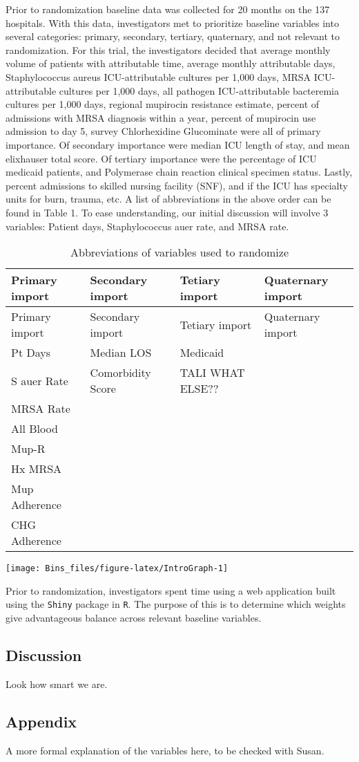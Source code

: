 \documentclass[]{sagej}
\begin{document}
Prior to randomization baseline data was collected for 20 months on the
137 hospitals. With this data, investigators met to prioritize baseline
variables into several categories: primary, secondary, tertiary,
quaternary, and not relevant to randomization. For this trial, the
investigators decided that average monthly volume of patients with
attributable time, average monthly attributable days, Staphylococcus
aureus ICU-attributable cultures per 1,000 days, MRSA ICU-attributable
cultures per 1,000 days, all pathogen ICU-attributable bacteremia
cultures per 1,000 days, regional mupirocin resistance estimate, percent
of admissions with MRSA diagnosis within a year, percent of mupirocin
use admission to day 5, survey Chlorhexidine Glucominate were all of
primary importance. Of secondary importance were median ICU length of
stay, and mean elixhauser total score. Of tertiary importance were the
percentage of ICU medicaid patients, and Polymerase chain reaction
clinical specimen status. Lastly, percent admissions to skilled nursing
facility (SNF), and if the ICU has specialty units for burn, trauma,
etc. A list of abbreviations in the above order can be found in Table 1.
To ease understanding, our initial discussion will involve 3 variables:
Patient days, Staphylococcus auer rate, and MRSA rate.

\begin{longtable}[]{@{}llll@{}}
\caption{Abbreviations of variables used to randomize}\tabularnewline
\toprule
Primary import & Secondary import & Tetiary import & Quaternary
import\tabularnewline
\midrule
\endfirsthead
\toprule
Primary import & Secondary import & Tetiary import & Quaternary
import\tabularnewline
\midrule
\endhead
Pt Days & Median LOS & Medicaid\tabularnewline
S auer Rate & Comorbidity Score & TALI WHAT ELSE??\tabularnewline
MRSA Rate &\tabularnewline
All Blood &\tabularnewline
Mup-R &\tabularnewline
Hx MRSA &\tabularnewline
Mup Adherence &\tabularnewline
CHG Adherence &\tabularnewline
\bottomrule
\end{longtable}

\begin{center}\texttt{[image: Bins\_files/figure-latex/IntroGraph-1]} \end{center}

Prior to randomization, investigators spent time using a web application
built using the \texttt{Shiny} package in \texttt{R}. The purpose of
this is to determine which weights give advantageous balance across
relevant baseline variables.

\subsection{Discussion}\label{discussion}

Look how smart we are.

\subsection{Appendix}\label{appendix}

A more formal explanation of the variables here, to be checked with
Susan.


\end{document}
